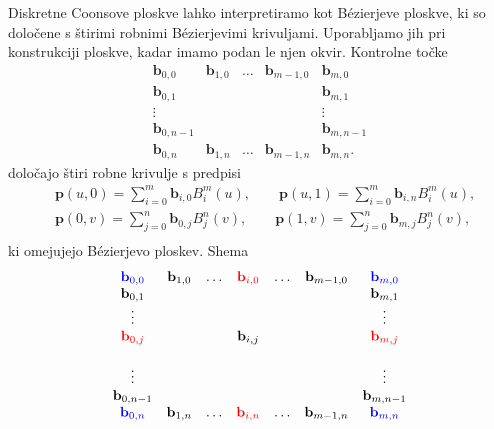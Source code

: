 \documentclass[a4paper,12pt]{article}
\begin{document}
Diskretne Coonsove ploskve lahko interpretiramo kot Bézierjeve ploskve, ki so določene s štirimi robnimi
Bézierjevimi krivuljami. Uporabljamo jih pri konstrukciji ploskve, kadar imamo podan le njen okvir.
Kontrolne točke
$$
\begin{matrix}
   \mathbf{b}_{0,0}  &\mathbf{b}_{1,0} & \ldots &\mathbf{b}_{m-1,0} &\mathbf{b}_{m,0} \\
   \mathbf{b}_{0,1}  &                 &        &                   &\mathbf{b}_{m,1} \\
   \vdots            &                 &        &                   &  \vdots\\
   \mathbf{b}_{0,n-1} &                &        &                    &\mathbf{b}_{m,n-1} \\ 
   \mathbf{b}_{0,n}  &\mathbf{b}_{1,n} & \ldots &\mathbf{b}_{m-1,n} &\mathbf{b}_{m,n}. 
\end{matrix}
$$
določajo štiri robne krivulje s predpisi
\begin{align*}
    &\mathbf{p}(u,0) =\sum_{i=0}^m \mathbf{b}_{i,0} B_i^m(u), \qquad
    \mathbf{p}(u,1) =\sum_{i=0}^m \mathbf{b}_{i,n} B_i^m(u),  \\
    &\mathbf{p}(0,v) =\sum_{j=0}^n \mathbf{b}_{0,j} B_j^n(v), \qquad
    \mathbf{p}(1,v) =\sum_{j=0}^n \mathbf{b}_{m,j} B_j^n(v),  \\
 \end{align*}
ki omejujejo Bézierjevo ploskev.
Shema  
 $$
 \begin{matrix}
     \color{blue} \mathbf{b}_{0,0}  &\mathbf{b}_{1,0} & \ldots & \color{red} \mathbf{b}_{i,0} & \ldots &\mathbf{b}_{m-1,0}  &\color{blue} \mathbf{b}_{m,0} \\
    \mathbf{b}_{0,1}  &                 &        & &      &                   &\mathbf{b}_{m,1} \\
    \vdots            &                 &        & &     &                   &  \vdots\\
    \color{red} \mathbf{b}_{0,j}                 &                 &        & \mathbf{b}_{i,j} &  &   & \color{red} \mathbf{b}_{m,j} \\                  &  \\
    \vdots            &                 &        & &    &                   & \vdots \\
    \mathbf{b}_{0,n-1} &                &         & &     &                    &\mathbf{b}_{m,n-1} \\ 
    \color{blue} \mathbf{b}_{0,n}  &\mathbf{b}_{1,n} & \ldots  & \color{red} \mathbf{b}_{i,n} & \ldots  &\mathbf{b}_{m-1,n} &\color{blue} \mathbf{b}_{m,n} 
 \end{matrix}
 $$
\end{document}

